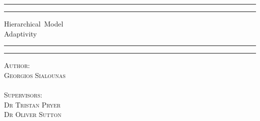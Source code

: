 \documentclass[12pt,a4paper]{article}
\theoremstyle{definition}
\begin{document}
	\begin{titlepage} %
		\centering %
		\scshape %
		\rule{\textwidth}{1.6pt}\vspace*{-\baselineskip}\vspace*{2pt} %
		\rule{\textwidth}{0.4pt} %
		
		{\LARGE Hierarchical\ Model\\ Adaptivity\\} %
		
		\vspace{0.75\baselineskip} %
		
		\rule{\textwidth}{0.4pt}\vspace*{-\baselineskip}\vspace{3.2pt} %
		\rule{\textwidth}{1.6pt} %
		
		
		
		
		

		
		\vspace{0.5\baselineskip} %
		
		{\scshape\Large Author:\\ Georgios Sialounas \\$\,$\\ Supervisors: \\Dr Tristan Pryer\\Dr Oliver Sutton} %
		

\end{titlepage}
\end{document}
